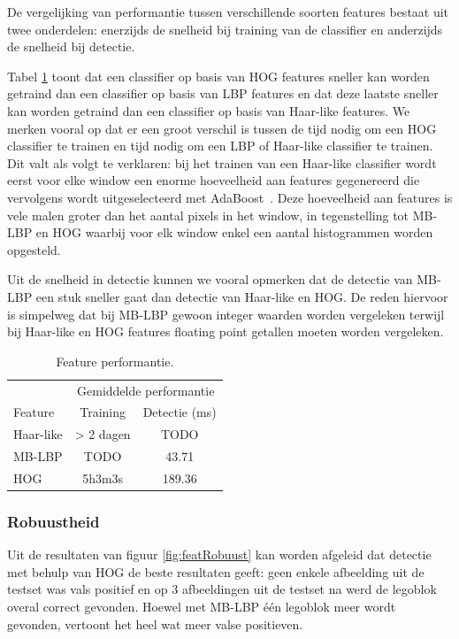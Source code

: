 De vergelijking van performantie tussen verschillende soorten features bestaat uit twee onderdelen: enerzijds de snelheid bij training van de classifier en anderzijds de snelheid bij detectie. 

Tabel \ref{tab:feat_perf} toont dat een classifier op basis van HOG features sneller kan worden getraind dan een classifier op basis van LBP features en dat deze laatste sneller kan worden getraind dan een classifier op basis van Haar-like features. We merken vooral op dat er een groot verschil is tussen de tijd nodig om een HOG classifier te trainen en tijd nodig om een LBP of Haar-like classifier te trainen. Dit valt als volgt te verklaren: bij het trainen van een Haar-like classifier wordt eerst voor elke window een enorme hoeveelheid aan features gegenereerd die vervolgens wordt uitgeselecteerd met AdaBoost~\cite{freund1995desicion}. Deze hoeveelheid aan features is vele malen groter dan het aantal pixels in het window, in tegenstelling tot MB-LBP en HOG waarbij voor elk window enkel een aantal histogrammen worden opgesteld.

Uit de snelheid in detectie kunnen we vooral opmerken dat de detectie van MB-LBP een stuk sneller gaat dan detectie van Haar-like en HOG. De reden hiervoor is simpelweg dat bij MB-LBP gewoon integer waarden worden vergeleken terwijl bij Haar-like en HOG features floating point getallen moeten worden vergeleken. 

\begin{table}
  \centering
  \begin{tabular}{@{}lcc@{}} \toprule
    & \multicolumn{2}{c}{Gemiddelde performantie} \\ \cmidrule(r){2-3}
    Feature & Training & Detectie (ms)\\ \midrule
    Haar-like & > 2 dagen & TODO \\
    MB-LBP & TODO & 43.71 \\
    HOG & 5h3m3s & 189.36 \\ \bottomrule
  \end{tabular}
  \caption{Feature performantie.}
  \label{tab:feat_perf}
\end{table}

\subsubsection*{Robuustheid}

Uit de resultaten van figuur \ref{fig:featRobuust} kan worden afgeleid dat detectie met behulp van HOG de beste resultaten geeft: geen enkele afbeelding uit de testset was vals positief en op 3 afbeeldingen uit de testset na werd de legoblok overal correct gevonden. Hoewel met MB-LBP \'e\'en legoblok meer wordt gevonden, vertoont het heel wat meer valse positieven.

